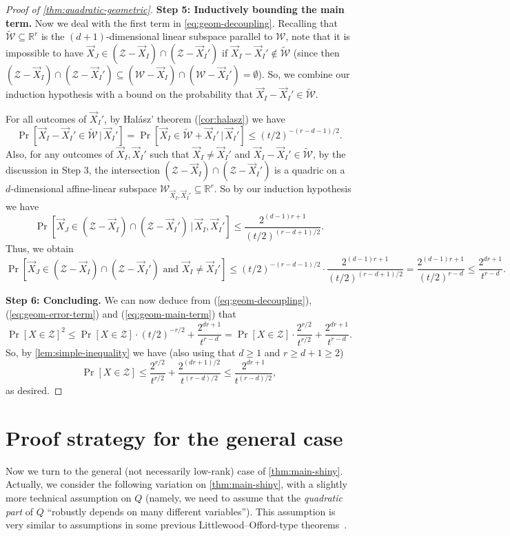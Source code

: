 \documentclass[english]{article}
\theoremstyle{remark}
\numberwithin{equation}{section}
\numberwithin{figure}{section}
\newcommand{\su}{\subseteq}
\newcommand{\RR}{\mathbb{R}}
\begin{document}
\begin{proof}[Proof of \cref{thm:quadratic-geometric}]
\textbf{Step 5: Inductively bounding the main term.} Now we deal with the first term in \cref{eq:geom-decoupling}. Recalling that $\tilde{\mathcal{W}}\su \RR^r$ is the $(d+1)$-dimensional linear subspace parallel to $\mathcal{W}$, note that it is impossible to have
$\vec{X}_J\in(\mathcal{Z}-\vec{X}_I)\cap(\mathcal{Z}-\vec{X}_I')$
if $\vec{X}_I-\vec{X}_I'\not\in\tilde{\mathcal{W}}$ (since then $(\mathcal{Z}-\vec{X}_I)\cap(\mathcal{Z}-\vec{X}_I')\su (\mathcal{W}-\vec{X}_I)\cap(\mathcal{W}-\vec{X}_I')=\emptyset$). So, we
combine our induction hypothesis with a bound on the probability that
$\vec{X}_I-\vec{X}_I'\in\tilde{\mathcal{W}}$.

For all outcomes of $\vec{X}_I'$, by Hal\'asz'
theorem (\cref{cor:halasz}) we have
\[\Pr[\vec{X}_I-\vec{X}_I'\in\tilde{\mathcal{W}}\,|\,\vec{X}_I']=\Pr[\vec{X}_I\in\tilde{\mathcal{W}}+\vec{X}_I'\,|\,\vec{X}_I']\le(t/2)^{-(r-d-1)/2}.
\]
Also, for any outcomes of $\vec{X}_I,\vec{X}_I'$ such that $\vec{X}_I\ne \vec{X}_I'$ and $\vec{X}_I-\vec{X}_I'\in\tilde{\mathcal{W}}$, by the discussion in Step 3, the intersection $(\mathcal{Z}-\vec{X}_I)\cap(\mathcal{Z}-\vec{X}_I')$ is a quadric on a $d$-dimensional affine-linear subspace $\mathcal{W}_{\vec{X}_I,\vec{X}_I'}\su \RR^r$. So by our induction hypothesis we have
\[\Pr[\vec{X}_J\in(\mathcal{Z}-\vec{X}_I)\cap(\mathcal{Z}-\vec{X}_I')\,|\,\vec{X}_I,\vec{X}_I']\le\frac{2^{(d-1)r+1}}{(t/2)^{(r-d+1)/2}}.\]
Thus, we obtain
\begin{equation}\label{eq:geom-main-term}
    \Pr[\vec{X}_J\in(\mathcal{Z}-\vec{X}_I)\cap(\mathcal{Z}-\vec{X}_I')\text{ and }\vec{X}_I\ne\vec{X}_I']\le (t/2)^{-(r-d-1)/2}\cdot\frac{2^{(d-1)r+1}}{(t/2)^{(r-d+1)/2}}=\frac{2^{(d-1)r+1}}{(t/2)^{r-d}}\le\frac{2^{dr+1}}{t^{r-d}}.
\end{equation}

\textbf{Step 6: Concluding.} We can now deduce from (\ref{eq:geom-decoupling}), (\ref{eq:geom-error-term}) and (\ref{eq:geom-main-term})
that
\[\Pr[X\in\mathcal{Z}]^{2} \le\Pr[X\in\mathcal{Z}]\cdot(t/2)^{-r/2}+\frac{2^{dr+1}}{t^{r-d}}=\Pr[X\in\mathcal{Z}]\cdot \frac{2^{r/2}}{t^{r/2}}+\frac{2^{dr+1}}{t^{r-d}}.\]
So, by \cref{lem:simple-inequality} we have (also using that $d\ge 1$ and $r\ge d+1\ge 2$)
\[
\Pr[X\in\mathcal{Z}]\le \frac{2^{r/2}}{t^{r/2}}+\frac{2^{(dr+1)/2}}{t^{(r-d)/2}}\le\frac{2^{dr+1}}{t^{(r-d)/2}},
\]
as desired.
\end{proof}

\section{Proof strategy for the general case}
Now we turn to the general (not necessarily low-rank) case of \cref{thm:main-shiny}. Actually, we consider the following variation on \cref{thm:main-shiny}, with a slightly more technical assumption on $Q$ (namely, we need to assume that the \emph{quadratic part} of $Q$ ``robustly depends on many different variables''). This assumption is very similar to assumptions in some previous Littlewood--Offord-type theorems~\cite{MNV16,RV13}.
\end{document}
